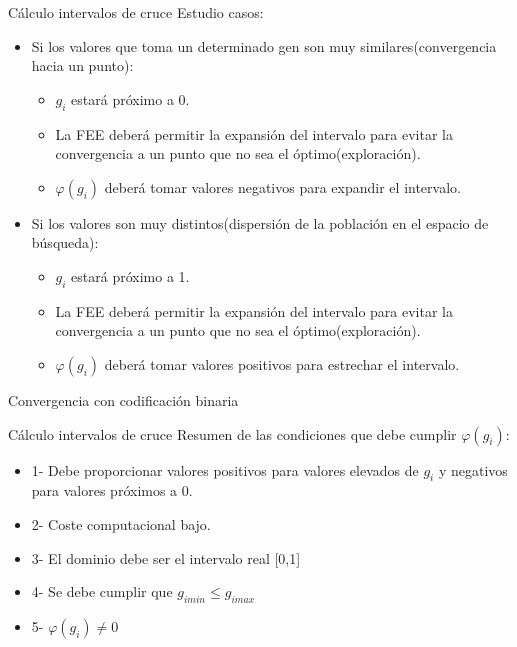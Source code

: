 \documentclass[10pt]{beamer}
\begin{document}
\begin{frame}{Cálculo intervalos de cruce}
	Estudio casos:
	\begin{itemize}
		\item Si los valores que toma un determinado gen son muy similares(convergencia hacia un punto):
		\begin{itemize}
			\item $g_{i}$ estará próximo a 0.
			\item La FEE deberá permitir la expansión del intervalo para evitar la convergencia a un punto que no sea el óptimo(exploración).
			\item $\varphi(g_{i})$ deberá tomar valores negativos para expandir el intervalo.
		\end{itemize}
		\item Si los valores son muy distintos(dispersión de la población en el espacio de búsqueda):
		\begin{itemize}
			\item $g_{i}$ estará próximo a 1.
			\item La FEE deberá permitir la expansión del intervalo para evitar la convergencia a un punto que no sea el óptimo(exploración).
			\item $\varphi(g_{i})$ deberá tomar valores positivos para estrechar el intervalo.
		\end{itemize}
	\end{itemize}
\end{frame}

\begin{frame}{Convergencia con codificación binaria}
\end{frame}

\begin{frame}{Cálculo intervalos de cruce}
	Resumen de las condiciones que debe cumplir $\varphi(g_{i})$:
	\begin{itemize}
		\item 1- Debe proporcionar valores positivos para valores elevados de $g_{i}$ y negativos para valores próximos a 0.
		\item 2- Coste computacional bajo.
		\item 3- El dominio debe ser el intervalo real [0,1]
		\item 4- Se debe cumplir que $g_{imin}\leq g_{imax}$
		\item 5- $\varphi(g_{i})\neq 0$
	\end{itemize}		
\end{frame}
\end{document}
